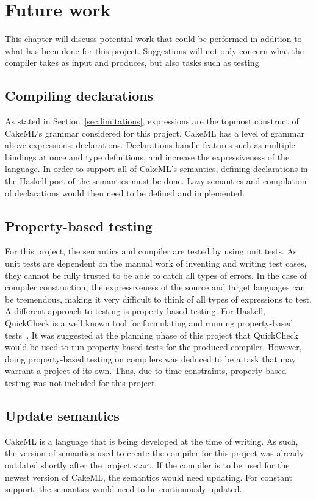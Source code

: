\chapter{Future work}

This chapter will discuss potential work that could be performed in
addition to what has been done for this project. Suggestions will not only
concern what the compiler takes as input and produces, but also tasks such as
testing.

\section{Compiling declarations}
As stated in Section~\ref{sec:limitations}, expressions are the topmost
construct of CakeML's grammar considered for this project. CakeML has a level
of grammar above expressions: declarations. Declarations handle
features such as multiple
bindings at once and type definitions, and increase the expressiveness of the
language. In order to support all of CakeML's semantics, defining declarations
in the Haskell port of the semantics must be done. Lazy semantics and
compilation of declarations would then need to be defined and implemented.

\section{Property-based testing}
For this project, the semantics and compiler are tested by using unit tests.
As unit tests are dependent on the manual work of inventing and writing
test cases, they cannot be fully trusted to be able to catch all types of
errors. In the case of compiler construction, the expressiveness of the
source and target languages can be tremendous, making it very difficult to
think of all types of expressions to test. A different approach to testing
is property-based testing. For Haskell, QuickCheck is a well known tool for
formulating and running property-based
tests~\cite{Claessen:2000:QLT:351240.351266}.
It was suggested at the planning phase of this project that QuickCheck would
be used to run property-based tests for the produced compiler. However, doing
property-based testing on compilers was deduced to be a task that may warrant
a project of its own. Thus, due to time constraints, property-based testing
was not included for this project.

\section{Update semantics}
CakeML is a language that is being developed at the time of
writing. As such, the version of semantics used to create the compiler for this
project was already outdated shortly after the project start. If the compiler
is to be used for the newest version of CakeML, the semantics would need
updating. For constant support, the semantics would need to be continuously
updated.

